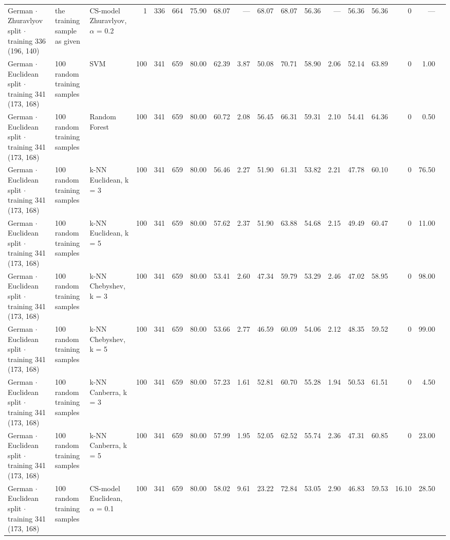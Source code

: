 \begin{longtable}{lllrrrrrrrrrrrrrrl}
  German $\cdot$ Zhuravlyov split $\cdot$ training 336 (196, 140) & the training sample as given & CS-model Zhuravlyov, $\alpha$ = 0.2 & 1 & 336 & 664 & 75.90 & 68.07 & --- & 68.07 & 68.07 & 56.36 & --- & 56.36 & 56.36 & 0 & --- &  \\
  German $\cdot$ Euclidean split $\cdot$ training 341 (173, 168) & 100 random training samples & SVM & 100 & 341 & 659 & 80.00 & 62.39 & 3.87 & 50.08 & 70.71 & 58.90 & 2.06 & 52.14 & 63.89 & 0 & 1.00 &  \\
  German $\cdot$ Euclidean split $\cdot$ training 341 (173, 168) & 100 random training samples & Random Forest & 100 & 341 & 659 & 80.00 & 60.72 & 2.08 & 56.45 & 66.31 & 59.31 & 2.10 & 54.41 & 64.36 & 0 & 0.50 &  \\
  German $\cdot$ Euclidean split $\cdot$ training 341 (173, 168) & 100 random training samples & k-NN Euclidean, k = 3 & 100 & 341 & 659 & 80.00 & 56.46 & 2.27 & 51.90 & 61.31 & 53.82 & 2.21 & 47.78 & 60.10 & 0 & 76.50 &  \\
  German $\cdot$ Euclidean split $\cdot$ training 341 (173, 168) & 100 random training samples & k-NN Euclidean, k = 5 & 100 & 341 & 659 & 80.00 & 57.62 & 2.37 & 51.90 & 63.88 & 54.68 & 2.15 & 49.49 & 60.47 & 0 & 11.00 &  \\
  German $\cdot$ Euclidean split $\cdot$ training 341 (173, 168) & 100 random training samples & k-NN Chebyshev, k = 3 & 100 & 341 & 659 & 80.00 & 53.41 & 2.60 & 47.34 & 59.79 & 53.29 & 2.46 & 47.02 & 58.95 & 0 & 98.00 &  \\
  German $\cdot$ Euclidean split $\cdot$ training 341 (173, 168) & 100 random training samples & k-NN Chebyshev, k = 5 & 100 & 341 & 659 & 80.00 & 53.66 & 2.77 & 46.59 & 60.09 & 54.06 & 2.12 & 48.35 & 59.52 & 0 & 99.00 &  \\
  German $\cdot$ Euclidean split $\cdot$ training 341 (173, 168) & 100 random training samples & k-NN Canberra, k = 3 & 100 & 341 & 659 & 80.00 & 57.23 & 1.61 & 52.81 & 60.70 & 55.28 & 1.94 & 50.53 & 61.51 & 0 & 4.50 &  \\
  German $\cdot$ Euclidean split $\cdot$ training 341 (173, 168) & 100 random training samples & k-NN Canberra, k = 5 & 100 & 341 & 659 & 80.00 & 57.99 & 1.95 & 52.05 & 62.52 & 55.74 & 2.36 & 47.31 & 60.85 & 0 & 23.00 &  \\
  German $\cdot$ Euclidean split $\cdot$ training 341 (173, 168) & 100 random training samples & CS-model Euclidean, $\alpha$ = 0.1 & 100 & 341 & 659 & 80.00 & 58.02 & 9.61 & 23.22 & 72.84 & 53.05 & 2.90 & 46.83 & 59.53 & 16.10 & 28.50 &  \\

\end{longtable}
